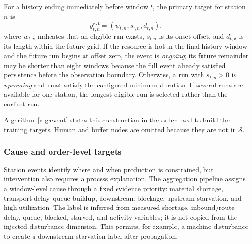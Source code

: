 \documentclass[a4paper,fleqn]{cas-dc}
\begin{document}
For a history ending immediately before window $t$, the primary target for station $n$ is
\begin{equation}
y_{t,n}^{\mathrm{evt}}=(w_{t,n},s_{t,n},d_{t,n}),
\end{equation}
where $w_{t,n}$ indicates that an eligible run exists, $s_{t,n}$ is its onset offset, and $d_{t,n}$ is its length within the future grid. If the resource is hot in the final history window and the future run begins at offset zero, the event is \emph{ongoing}; its future remainder may be shorter than eight windows because the full event already satisfied persistence before the observation boundary. Otherwise, a run with $s_{t,n}>0$ is \emph{upcoming} and must satisfy the configured minimum duration. If several runs are available for one station, the longest eligible run is selected rather than the earliest run.


Algorithm~\ref{alg:event} states this construction in the order used to build the training targets. Human and buffer nodes are omitted because they are not in $\mathcal{S}$.


\begin{algorithm}[t]
\caption{Bottleneck-event construction.}
\label{alg:event}
\;
\;
\;
\end{algorithm}

\subsubsection{Cause and order-level targets}

Station events identify where and when production is constrained, but intervention also requires a process explanation. The aggregation pipeline assigns a window-level cause through a fixed evidence priority: material shortage, transport delay, queue buildup, downstream blockage, upstream starvation, and high utilization. The label is inferred from measured shortage, inbound/route delay, queue, blocked, starved, and activity variables; it is not copied from the injected disturbance dimension. This permits, for example, a machine disturbance to create a downstream starvation label after propagation.
\end{document}
